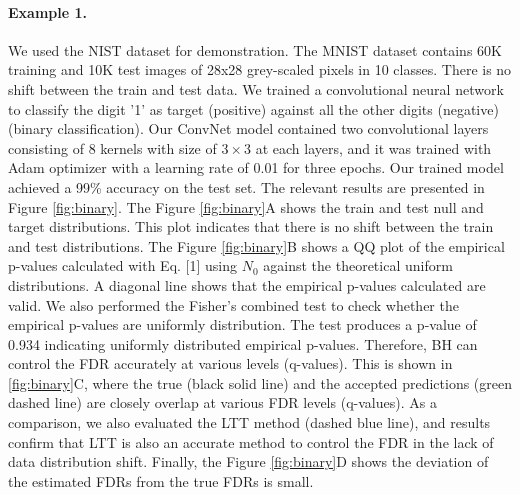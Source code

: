 \documentclass{article}
\begin{document}
\paragraph{Example 	 1.} \label{ex:vanilla} We used the NIST dataset for demonstration. The MNIST dataset contains 60K training and 10K test images of 28x28 grey-scaled pixels in 10 classes. There is no shift between the train and test data. We trained a convolutional neural network to classify the digit '1' as target (positive) against all the other digits (negative) (binary classification). Our ConvNet model contained two convolutional layers consisting of 8 kernels with size of $3\times3$ at each layers, and it was trained with Adam optimizer with a learning rate of 0.01 for three epochs. Our trained model achieved a 99\% accuracy on the test set. The relevant results are presented in Figure \ref{fig:binary}. The Figure \ref{fig:binary}A shows the train and test null and target distributions. This plot indicates that there is no shift between the train and test distributions. The Figure \ref{fig:binary}B shows a QQ plot of the empirical p-values calculated with Eq. [1] using $N_0$ against the theoretical uniform distributions. A diagonal line shows that the empirical p-values calculated are valid. We also performed the Fisher's combined test to check whether the empirical p-values are uniformly distribution. The test produces a p-value of 0.934 indicating uniformly distributed empirical p-values. Therefore, BH can control the FDR accurately at various levels (q-values). This is shown in \ref{fig:binary}C, where the true (black solid line) and the accepted predictions (green dashed line) are closely overlap at various FDR levels (q-values). As a comparison, we also evaluated the LTT method \cite{angelopoulos2021learn} (dashed blue line), and results confirm that LTT is also an accurate method to control the FDR in the lack of data distribution shift. Finally, the Figure \ref{fig:binary}D shows the deviation of the estimated FDRs from the true FDRs is small.
\end{document}
